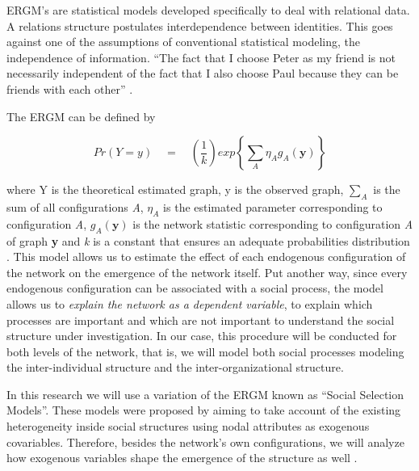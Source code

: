 \documentclass[a4paper, 12pt, openright, oneside, german, french, brazil, english]{abntex2}
\begin{document}
	ERGM's \cite{robins2007introduction,lusher2013exponential} are statistical models developed specifically to deal with relational data. A relations structure postulates interdependence between identities. This goes against one of the assumptions of conventional statistical modeling, the independence of information. ``The fact that I choose Peter as my friend is not necessarily independent of the fact that I also choose Paul because they can be friends with each other'' \cite[p. 76]{lazega2014redes}.
	
	The ERGM can be defined by
	
		
	$$Pr(Y=y) \quad = \quad \left(\frac{1}{k}\right) exp \left\{ \sum_{A} \eta_A g_A (\textbf{y}) \right\}$$
	
	where Y is the theoretical estimated graph, y is the observed graph, $\sum_{A}$ is the sum of all configurations \textit{A},  $\eta_A$ is the estimated parameter corresponding to configuration \textit{A}, $g_A(\textbf{y})$ is the network statistic corresponding to configuration \textit{A} of graph \textbf{y} and \textit{k} is a constant that ensures an adequate probabilities distribution \cite{robins2007introduction}. This model allows us to estimate the effect of each endogenous configuration of the network on the emergence of the network itself. Put another way, since every endogenous configuration can be associated with a social process, the model allows us to \textit{explain the network as a dependent variable}, to explain which processes are important and which are not important to understand the social structure under investigation. In our case, this procedure will be conducted for both levels of the network, that is, we will model both social processes modeling the inter-individual structure and the inter-organizational structure.
		
	
	In this research we will use a variation of the ERGM known as ``Social Selection Models''. These models were proposed by  aiming to take account of the existing heterogeneity inside social structures using nodal attributes as exogenous covariables. Therefore, besides the network's own configurations, we will analyze how exogenous variables shape the emergence of the structure as well \cite{wang2016social}.
	
\end{document}
